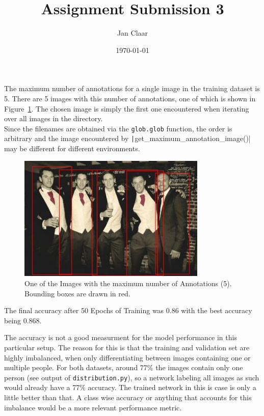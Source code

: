 \documentclass[
    headings=optiontohead,              %
    12pt,                               %
    DIV=13,                             %
    twoside=false,                      %
    open=right,                         %
    BCOR=00mm,                          %
    toc=bibliographynumbered,            %
    parskip=half,                       %
]{scrarticle}
\title{Assignment Submission 3}
\author{Jan Claar}
\date{\today}
\begin{document}
    \head 


    The maximum number of annotations for a single image in the training dataset is 5. There are 5 images with this number of annotations, one of which is shown in Figure~\ref{fig:annotation_max}. The chosen image is simply the first one encountered when iterating over all images in the directory.\\
    Since the filenames are obtained via the \texttt{glob.glob} function, the order is arbitrary and the image encountered by \texttt|get_maximum_annotation_image()| may be different for different environments.

    \begin{figure}[htpb]
        \begin{center}
            \includegraphics[width=0.8\textwidth]{../00152479_annotated.jpg}
        \end{center}
        \caption{One of the Images with the maximum number of Annotations (5). Bounding boxes are drawn in red.}
        \label{fig:annotation_max}
    \end{figure}
    

    The final accuracy after 50 Epochs of Training was \SI{0.86}{} with the best accuracy being \SI{0.868}{}. 

    The accuracy is not a good measurment for the model performance in this particular setup. The reason for this is that the training and validation set are highly imbalanced, when only differentiating between images containing one or multiple people. For both datasets, around 77\% the images contain only one person (see output of \texttt{\footnotesize{distribution.py}}), so a network labeling all images as such would already have a 77\% accuracy. The trained network in this is case is only a little better than that. A class wise accuracy or anything that accounts for this imbalance would be a more relevant performance metric.
\end{document}

